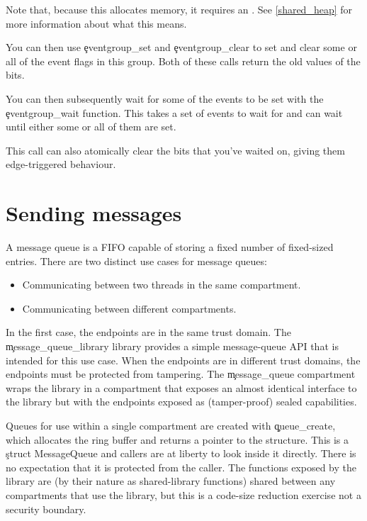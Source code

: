 
Note that, because this allocates memory, it requires an .
See \ref{shared_heap} for more information about what this means.

You can then use \c{eventgroup_set} and \c{eventgroup_clear} to set and clear some or all of the event flags in this group.
Both of these calls return the old values of the bits.



You can then subsequently wait for some of the events to be set with the \c{eventgroup_wait} function.
This takes a set of events to wait for and can wait until either some or all of them are set.


This call can also atomically clear the bits that you've waited on, giving them edge-triggered behaviour.

\section[label=message_queue]{Sending messages}

A message queue is a FIFO capable of storing a fixed number of fixed-sized entries.
There are two distinct use cases for message queues:

\begin{itemize}
	\item{Communicating between two threads in the same compartment.}
	\item{Communicating between different compartments.}
\end{itemize}

In the first case, the endpoints are in the same trust domain.
The \c{message_queue_library} library provides a simple message-queue API that is intended for this use case.
When the endpoints are in different trust domains, the endpoints must be protected from tampering.
The \c{message_queue} compartment wraps the library in a compartment that exposes an almost identical interface to the library but with the endpoints exposed as (tamper-proof) sealed capabilities.

Queues for use within a single compartment are created with \c{queue_create}, which allocates the ring buffer and returns a pointer to the structure.
This is a \c{struct MessageQueue} and callers are at liberty to look inside it directly.
There is no expectation that it is protected from the caller.
The functions exposed by the library are (by their nature as shared-library functions) shared between any compartments that use the library, but this is a code-size reduction exercise not a security boundary.

